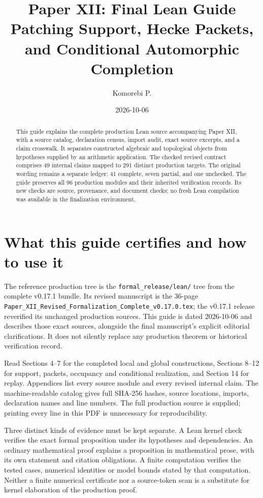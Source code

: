 \documentclass[11pt]{article}
\title{Paper XII: Final Lean Guide\\\large Patching Support, Hecke Packets, and Conditional Automorphic Completion}
\author{Komorebi P.}\date{2026-10-06}
\newcommand{\code}[1]{\nolinkurl{#1}}
\begin{document}
\KomorebiCover

\relax
\begin{abstract}
This guide explains the complete production Lean source accompanying Paper XII, with a source catalog, declaration census, import audit, exact source excerpts, and a claim crosswalk. It separates constructed algebraic and topological objects from hypotheses supplied by an arithmetic application. The checked revised contract comprises 49 internal claims mapped to 291 distinct production targets. The original wording remains a separate ledger: 41 complete, seven partial, and one unchecked. The guide preserves all 96 production modules and their inherited verification records. Its new checks are source, provenance, and document checks; no fresh Lean compilation was available in the finalization environment.
\end{abstract}
\tableofcontents
\newpage

\section{What this guide certifies and how to use it}
The reference production tree is the \code{formal_release/lean/} tree from the complete v0.17.1 bundle. Its revised manuscript is the 36-page \code{Paper_XII_Revised_Formalization_Complete_v0.17.0.tex}; the v0.17.1 release reverified its unchanged production sources. This guide is dated 2026-10-06 and describes those exact sources, alongside the final manuscript's explicit editorial clarifications. It does not silently replace any production theorem or historical verification record.

Read Sections 4--7 for the completed local and global constructions, Sections 8--12 for support, packets, occupancy and conditional realization, and Section 14 for replay. Appendices list every source module and every revised internal claim. The machine-readable catalog gives full SHA-256 hashes, source locations, imports, declaration names and line numbers. The full production source is supplied; printing every line in this PDF is unnecessary for reproducibility.

Three distinct kinds of evidence must be kept separate. A Lean kernel check verifies the exact formal proposition under its hypotheses and dependencies. An ordinary mathematical proof explains a proposition in mathematical prose, with its own statement and citation obligations. A finite computation verifies the tested cases, numerical identities or model bounds stated by that computation. Neither a finite numerical certificate nor a source-token scan is a substitute for kernel elaboration of the production proof.
\end{document}
